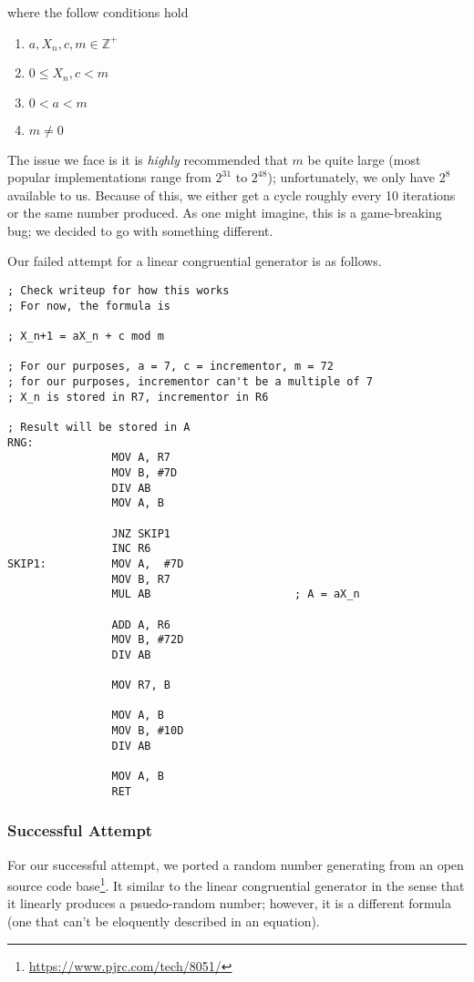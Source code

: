 \documentclass[12pt]{article}
\begin{document}
\noindent where the follow conditions hold

\begin{enumerate}
    \item $a, X_n, c, m \in \mathbb{Z}^+$
    \item $0 \leq X_n, c < m$
    \item $0 < a < m$
    \item $m \neq 0$
\end{enumerate}

The issue we face is it is \textit{highly} recommended that $m$ be quite large (most popular implementations range from $2^{31}$ to $2^{48}$); unfortunately, we only have $2^8$ available to us. Because of this, we either get a cycle roughly every \num{10} iterations or the same number produced. As one might imagine, this is a game-breaking bug; we decided to go with something different.

Our failed attempt for a linear congruential generator is as follows.

\begin{verbatim}
; Check writeup for how this works
; For now, the formula is

; X_n+1 = aX_n + c mod m

; For our purposes, a = 7, c = incrementor, m = 72
; for our purposes, incrementor can't be a multiple of 7
; X_n is stored in R7, incrementor in R6

; Result will be stored in A
RNG:
                MOV A, R7
                MOV B, #7D
                DIV AB
                MOV A, B

                JNZ SKIP1
                INC R6
SKIP1:          MOV A,  #7D
                MOV B, R7
                MUL AB                      ; A = aX_n

                ADD A, R6
                MOV B, #72D
                DIV AB

                MOV R7, B

                MOV A, B
                MOV B, #10D
                DIV AB

                MOV A, B
                RET
\end{verbatim}

\subsubsection{Successful Attempt}
For our successful attempt, we ported a random number generating from an open source code base\footnote{\url{https://www.pjrc.com/tech/8051/}}. It similar to the linear congruential generator in the sense that it linearly produces a psuedo-random number; however, it is a different formula (one that can't be eloquently described in an equation).
\end{document}
